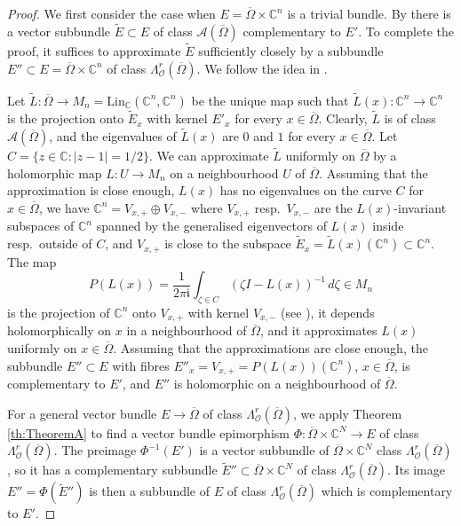 \documentclass[11pt]{amsart}
\numberwithin{equation}{section}
\theoremstyle{definition}
\newcommand\Ascr{\mathscr{A}}
\newcommand\Oscr{\mathscr{O}}
\newcommand\C{\mathbb{C}}
\newcommand\igot{\mathfrak{i}}
\renewcommand\igot{\mathfrak{i}}
\renewcommand\imath{\igot}
\newcommand\wt{\widetilde}
\newcommand\Lin{\mathrm{Lin}}
\begin{document}
\begin{proof}
We first consider the case when $E= \overline\Omega\times\C^n$
is a trivial bundle. By \cite[Theorem 3]{Heunemann1986II}
there is a vector subbundle $\wt E\subset E$ of class $\Ascr(\overline\Omega)$ 
complementary to $E'$. To complete the proof,
it suffices to approximate $\wt E$ sufficiently closely by a subbundle 
$E''\subset E=\overline\Omega\times\C^n$ of class 
$\Lambda^r_\Oscr(\overline\Omega)$. We follow the idea
in \cite[Proof of Lemma 2.2]{ForstnericLowOvrelid2001}.

Let $\wt L: \overline \Omega \to M_n=\Lin_\C(\C^n,\C^n)$ be the unique map
such that $\wt L(x):\C^n\to\C^n$ is the projection onto $\wt E_x$ 
with kernel $E'_x$ for every $x\in \overline \Omega$.
Clearly, $\wt L$ is of class $\Ascr(\overline\Omega)$, and 
the eigenvalues of $\wt L(x)$ are $0$ and $1$ for every 
$x\in \overline\Omega$. Let $C=\{z\in \C : |z-1|=1/2\}$. 
We can approximate $\wt L$ uniformly on $\overline\Omega$ 
by a holomorphic map $L:U \to M_n$ 
on a neighbourhood $U$ of $\overline\Omega$. 
Assuming that the approximation is close enough, 
$L(x)$ has no eigenvalues on the curve $C$ for $x\in\overline\Omega$,
we have $\C^n=V_{x,+} \oplus V_{x,-}$
where $V_{x,+}$ resp.\ $V_{x,-}$ are the $L(x)$-invariant 
subspaces of $\C^n$ spanned by the generalised
eigenvectors of $L(x)$ inside resp.\ outside of $C$, and  
$V_{x,+}$ is close to the subspace $\wt E_x=\wt L(x)(\C^n) \subset\C^n$. 
The map 
\[
	P(L(x))= \frac{1}{2\pi \imath} 
	\int_{\zeta\in C} \left(\zeta I-L(x) \right)^{-1}\, d\zeta \in M_n
\]
is the projection of $\C^n$ onto $V_{x,+}$ with kernel $V_{x,-}$ 
(see \cite{GohbergLancasterRodman1986}), it 
depends holomorphically on $x$ in a neighbourhood of $\overline\Omega$,
and it approximates $L(x)$ uniformly on $x\in \overline\Omega$. 
Assuming that the approximations are close enough, the subbundle 
$E''\subset E$ with fibres $E''_x=V_{x,+}=P(L(x))(\C^n)$, 
$x\in \overline\Omega$, is complementary to $E'$, 
and $E''$ is holomorphic on a neighbourhood of $\overline\Omega$. 

For a general vector bundle $E\to\overline\Omega$
of class $\Lambda^r_\Oscr(\overline\Omega)$, we apply 
Theorem \ref{th:TheoremA} to find a vector bundle
epimorphism $\Phi:\overline\Omega\times\C^N\to E$ of class
$\Lambda^r_\Oscr(\overline\Omega)$. The preimage $\Phi^{-1}(E')$
is a vector subbundle of $\overline\Omega\times\C^N$
class $\Lambda^r_\Oscr(\overline\Omega)$, 
so it has a complementary subbundle 
$\wt E''\subset \overline\Omega\times\C^N$
of class $\Lambda^r_\Oscr(\overline\Omega)$. 
Its image $E''=\Phi(\wt E'')$ is then a subbundle of $E$
of class $\Lambda^r_\Oscr(\overline\Omega)$ which is 
complementary to $E'$.
\end{proof}
\end{document}
